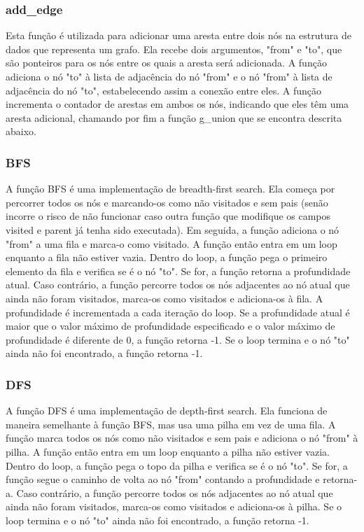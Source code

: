 \documentclass[a4paper,11pt]{article}
\begin{document}
    \subsubsection{add\_edge}
    Esta função é utilizada para adicionar uma aresta entre dois nós na estrutura de dados que representa um grafo. Ela recebe dois argumentos, "from" e "to", que são ponteiros para os nós entre os quais a aresta será adicionada.
    A função adiciona o nó "to" à lista de adjacência do nó "from" e o nó "from" à lista de adjacência do nó "to", estabelecendo assim a conexão entre eles.
    A função incrementa o contador de arestas em ambos os nós, indicando que eles têm uma aresta adicional, chamando por fim a função g\_union que se encontra descrita abaixo.

    \subsubsection{BFS}
    A função BFS é uma implementação de breadth-first search. Ela começa por percorrer todos os nós e marcando-os como não visitados e sem pais (senão incorre o risco de não funcionar caso outra função que modifique os campos visited e parent já tenha sido executada). Em seguida, a função adiciona o nó "from" a uma fila e marca-o como visitado. A função então entra em um loop enquanto a fila não estiver vazia. Dentro do loop, a função pega o primeiro elemento da fila e verifica se é o nó "to". Se for, a função retorna a profundidade atual. Caso contrário, a função percorre todos os nós adjacentes ao nó atual que ainda não foram visitados, marca-os como visitados e adiciona-os à fila. A profundidade é incrementada a cada iteração do loop. Se a profundidade atual é maior que o valor máximo de profundidade especificado e o valor máximo de profundidade é diferente de 0, a função retorna -1. Se o loop termina e o nó "to" ainda não foi encontrado, a função retorna -1.

    \subsubsection{DFS}
    A função DFS é uma implementação de depth-first search. Ela funciona de maneira semelhante à função BFS, mas usa uma pilha em vez de uma fila. A função marca todos os nós como não visitados e sem pais e adiciona o nó "from" à pilha. A função então entra em um loop enquanto a pilha não estiver vazia. Dentro do loop, a função pega o topo da pilha e verifica se é o nó "to". Se for, a função segue o caminho de volta ao nó "from" contando a profundidade e retorna-a. Caso contrário, a função percorre todos os nós adjacentes ao nó atual que ainda não foram visitados, marca-os como visitados e adiciona-os à pilha. Se o loop termina e o nó "to" ainda não foi encontrado, a função retorna -1.
    
\end{document}
